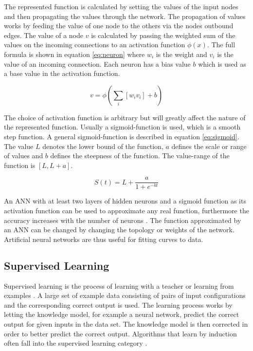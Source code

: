 The represented function is calculated by setting the values of the input nodes and then propagating the values through the network. The propagation of values works by feeding the value of one node to the others via the nodes outbound edges. The value of a node $v$ is calculated by passing the weighted sum of the values on the incoming connections to an activation function $\phi(x)$. The full formula is shown in equation \ref{eq:neuron} where $w_i$ is the weight and $v_i$ is the value of an incoming connection. Each neuron has a bias value $b$ which is used as a base value in the activation function.  

\begin{equation}
    v = \phi (\sum_i{[w_i v_i]} + b)
    \label{eq:neuron}
\end{equation}


\noindent
The choice of activation function is arbitrary but will greatly affect the nature of the represented function. Usually a sigmoid-function is used, which is a smooth step function. A general sigmoid-function is described in equation \ref{eq:sigmoid}. The value $L$ denotes the lower bound of the function, $a$ defines the scale or range of values and $b$ defines the steepness of the function. The value-range of the function is $[L, L+a]$.  

\begin{equation}
    S(t) = L + \frac{a}{1 + e^{-bt}}
    \label{eq:sigmoid}
\end{equation}

\noindent
An ANN with at least two layers of hidden neurons and a sigmoid function as its activation function can be used to approximate any real function, furthermore the accuracy increases with the number of neurons \cite{mitchel:approximation}. The function approximated by an ANN can be changed by changing the topology or weights of the network. Artificial neural networks are thus useful for fitting curves to data. 

\subsection{Supervised Learning}
Supervised learning is the process of learning with a teacher or learning from examples \cite{haykin}. A large set of example data consisting of pairs of input configurations and the corresponding correct output is used. The learning process works by letting the knowledge model, for example a neural network, predict the correct output for given inputs in the data set. The knowledge model is then corrected in order to better predict the correct output. Algorithms that learn by induction often fall into the supervised learning category \cite{glossary}. 

